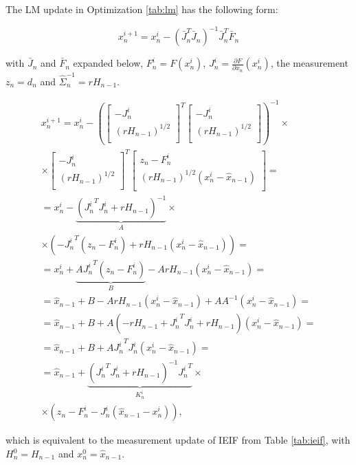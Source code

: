 \documentclass[10pt,twocolumn,letterpaper]{article}
\begin{document}
 The LM update in Optimization \ref{tab:lm} has the following form: 
 
 \begin{equation}
 x_n^{i + 1}= x_n^{i} - (\bar{J}_n^T \bar{J}_n)^{-1} \bar{J}_n^T \bar{F}_n 
\end{equation}
 
 with $\bar{J}_n$ and $\bar{F}_n$ expanded below, $F_n^i = F(x_n^i)$, 
 $J_n^i = \frac{\partial F}{\partial x_n}(x_n^i)$, the measurement $z_n = d_n$ and $\hat{\Sigma}_n^{-1} = r H_{n - 1}$.
 
 \begin{align*}
x_n^{i + 1}= x_n^{i} - \left(
\left[
	\begin{array}{cc}
		- J_n^i \\
		\left(r H_{n - 1}\right)^{1/2} \\
	\end{array}
\right]^T 
\left[
	\begin{array}{c}
		- J_n^i \\
		\left(r H_{n - 1}\right)^{1/2} \\
	\end{array}
\right]
\right)^{-1} \times\\
\times \left[
	\begin{array}{cc}
		- J_n^i \\
		\left(r H_{n - 1}\right)^{1/2} \\
	\end{array}
\right]^T 
\left[
	\begin{array}{c}
		z_n - F_n^i \\
		\left(r H_{n - 1}\right)^{1/2}(x_n^i - \hat{x}_{n - 1}) \\
	\end{array}
\right] = \\
= x_n^{i} - \underbrace{\left({J_n^i}^T J_n^i + r H_{n - 1}\right)^{-1}}_{A} \times \\
\times \left( - {J_n^i}^T(z_n - F_n^i) + r H_{n - 1}(x_n^i - \hat{x}_{n - 1})\right)  = \\
= x_n^i +\underbrace{A {J_n^i}^T(z_n - F_n^i)}_B - A r H_{n - 1}(x_n^i - \hat{x}_{n - 1})  = \\
= \hat{x}_{n - 1} + B  - A r H_{n - 1}(x_n^i - \hat{x}_{n - 1}) + A A^{-1}( x_n^i - \hat{x}_{n - 1}) = \\
= \hat{x}_{n - 1} + B + A(- r H_{n - 1} + {J_n^i}^T J_n^i + r H_{n - 1})(x_n^i - \hat{x}_{n - 1}) = \\
= \hat{x}_{n - 1} + B + A {J_n^i}^T J_n^i (x_n^i - \hat{x}_{n - 1}) = \\
= \hat{x}_{n - 1} + \underbrace{\left({J_n^i}^T J_n^i + r H_{n - 1}\right)^{-1} {J_n^i}^T}_{K_n^i} \times \\
\times (z_n - F_n^i - J_n^i (\hat{x}_{n - 1} - x_n^i)),
 \end{align*}
 
 which is equivalent to the measurement update of IEIF from Table \ref{tab:ieif}, with $H_n^0 = H_{n-1}$ and $x_n^0 = \hat{x}_{n - 1}$.

{\small


}
\end{document}
